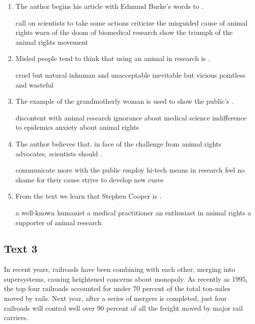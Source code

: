 \begin{enumerate}[resume]
	\item
 The author begins his article with Edmund Burke's words to \lineread.


\fourchoices
{call on scientists to take some actions}
{criticize the misguided cause of animal rights}
{warn of the doom of biomedical research}
{show the triumph of the animal rights movement}


\item
Misled people tend to think that using an animal in research is \lineread.


\fourchoices
{cruel but natural}
{inhuman and unacceptable}
{inevitable but vicious}
{pointless and wasteful}


\item
 The example of the grandmotherly woman is used to show the public's \lineread.


\fourchoices
{discontent with animal research}
{ignorance about medical science}
{indifference to epidemics}
{anxiety about animal rights}


\item
The author believes that, in face of the challenge from animal
rights advocates, scientists should \lineread.


\fourchoices
{communicate more with the public}
{employ hi-tech means in research}
{feel no shame for their cause}
{strive to develop new cures}


\item
From the text we learn that Stephen Cooper is \lineread.


\fourchoices
{a well-known humanist}
{a medical practitioner}
{an enthusiast in animal rights}
{a supporter of animal research}


\end{enumerate}



\newpage
\subsection{Text 3}


In recent years, railroads have been combining with each other, merging
into supersystems, causing heightened concerns about monopoly. As
recently as 1995, the top four railroads accounted for under 70 percent
of the total ton-miles moved by rails. Next year, after a series of
mergers is completed, just four railroads will control well over 90
percent of all the freight moved by major rail carriers.

